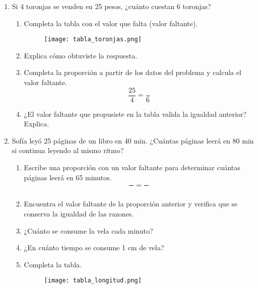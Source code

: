 \begin{enumerate}
    \item Si 4 toronjas se venden en 25 pesos, ¿cuánto cuestan 6 toronjas?
          \begin{enumerate}
              \item Completa la tabla con el valor que falta (valor faltante).
                    \begin{figure}[H]
                        \centering
                        \texttt{[image: tabla\_toronjas.png]}
                        \label{tab:tabla_toronjas}
                    \end{figure}
              \item Explica cómo obtuviste la respuesta.
              \item Completa la proporción a partir de los datos del problema y calcula el valor faltante.
                    \[\dfrac{25}{4} = \dfrac{}{6}\]
              \item ¿El valor faltante que propusiste en la tabla valida la igualdad anterior? Explica.
          \end{enumerate}
    \item Sofía leyó 25 páginas de un libro en 40 min. ¿Cuántas páginas leerá en 80 min si continua leyendo al mismo ritmo?
          \begin{enumerate}
              \item Escribe una proporción con un valor faltante para determinar cuántas páginas leerá en 65 minutos.
                    \[\dfrac{\text{ }}{\text{ }} = \dfrac{\text{ }}{\text{ }}\]
              \item Encuentra el valor faltante de la proporción anterior y verifica que se conserva la
                    igualdad de las razones.
              \item ¿Cuánto se consume la vela cada minuto?
              \item ¿En cuánto tiempo se consume 1 cm de vela?
              \item Completa la tabla.
                    \begin{figure}[H]
                        \centering
                        \texttt{[image: tabla\_longitud.png]}
                        \label{tab:tabla_longitud}
                    \end{figure}
          \end{enumerate}


\end{enumerate}
